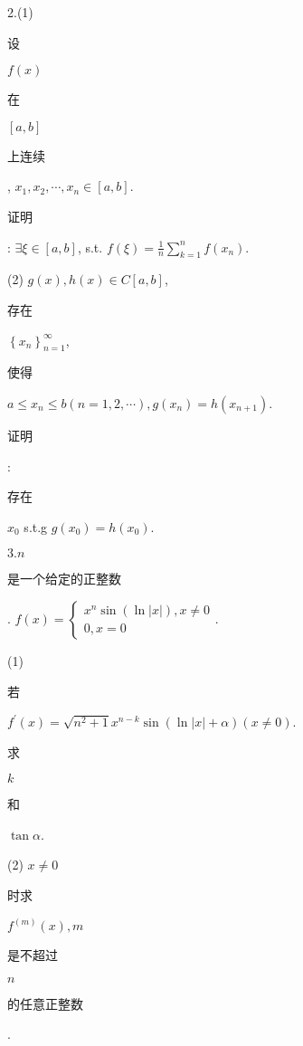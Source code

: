 \documentclass[10pt]{article}
\begin{document}
2.(1) \begin{CJK}{UTF8}{mj}设\end{CJK} $f(x)$ \begin{CJK}{UTF8}{mj}在\end{CJK} $[a, b]$ \begin{CJK}{UTF8}{mj}上连续\end{CJK}, $x_{1}, x_{2}, \cdots, x_{n} \in[a, b]$. \begin{CJK}{UTF8}{mj}证明\end{CJK}: $\exists \xi \in[a, b]$, s.t. $f(\xi)=\frac{1}{n} \sum_{k=1}^{n} f\left(x_{n}\right)$.

(2) $g(x), h(x) \in C[a, b]$, \begin{CJK}{UTF8}{mj}存在\end{CJK} $\left\{x_{n}\right\}_{n=1}^{\infty}$, \begin{CJK}{UTF8}{mj}使得\end{CJK} $a \leq x_{n} \leq b(n=1,2, \cdots), g\left(x_{n}\right)=h\left(x_{n+1}\right)$. \begin{CJK}{UTF8}{mj}证明\end{CJK}: \begin{CJK}{UTF8}{mj}存在\end{CJK} $x_{0}$ s.t.g $g\left(x_{0}\right)=h\left(x_{0}\right)$.

$3 . n$ \begin{CJK}{UTF8}{mj}是一个给定的正整数\end{CJK}. $f(x)=\left\{\begin{array}{l}x^{n} \sin (\ln |x|), x \neq 0 \\ 0, x=0\end{array}\right.$.

(1) \begin{CJK}{UTF8}{mj}若\end{CJK} $f^{\prime}(x)=\sqrt{n^{2}+1} x^{n-k} \sin (\ln |x|+\alpha)(x \neq 0)$. \begin{CJK}{UTF8}{mj}求\end{CJK} $k$ \begin{CJK}{UTF8}{mj}和\end{CJK} $\tan \alpha$.

(2) $x \neq 0$ \begin{CJK}{UTF8}{mj}时求\end{CJK} $f^{(m)}(x), m$ \begin{CJK}{UTF8}{mj}是不超过\end{CJK} $n$ \begin{CJK}{UTF8}{mj}的任意正整数\end{CJK}.
\end{document}
